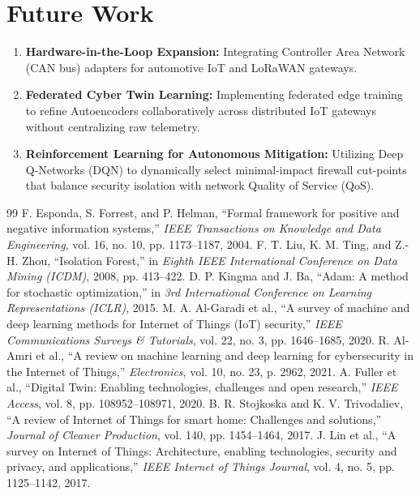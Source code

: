 \documentclass[12pt,a4paper]{report}
\begin{document}
\section{Future Work}
\begin{enumerate}
    \item \textbf{Hardware-in-the-Loop Expansion:} Integrating Controller Area Network (CAN bus) adapters for automotive IoT and LoRaWAN gateways.
    \item \textbf{Federated Cyber Twin Learning:} Implementing federated edge training to refine Autoencoders collaboratively across distributed IoT gateways without centralizing raw telemetry.
    \item \textbf{Reinforcement Learning for Autonomous Mitigation:} Utilizing Deep Q-Networks (DQN) to dynamically select minimal-impact firewall cut-points that balance security isolation with network Quality of Service (QoS).
\end{enumerate}

\begin{thebibliography}{99}
 F. Esponda, S. Forrest, and P. Helman, ``Formal framework for positive and negative information systems,'' \textit{IEEE Transactions on Knowledge and Data Engineering}, vol. 16, no. 10, pp. 1173--1187, 2004.
 F. T. Liu, K. M. Ting, and Z.-H. Zhou, ``Isolation Forest,'' in \textit{Eighth IEEE International Conference on Data Mining (ICDM)}, 2008, pp. 413--422.
 D. P. Kingma and J. Ba, ``Adam: A method for stochastic optimization,'' in \textit{3rd International Conference on Learning Representations (ICLR)}, 2015.
 M. A. Al-Garadi et al., ``A survey of machine and deep learning methods for Internet of Things (IoT) security,'' \textit{IEEE Communications Surveys \& Tutorials}, vol. 22, no. 3, pp. 1646--1685, 2020.
 R. Al-Amri et al., ``A review on machine learning and deep learning for cybersecurity in the Internet of Things,'' \textit{Electronics}, vol. 10, no. 23, p. 2962, 2021.
 A. Fuller et al., ``Digital Twin: Enabling technologies, challenges and open research,'' \textit{IEEE Access}, vol. 8, pp. 108952--108971, 2020.
 B. R. Stojkoska and K. V. Trivodaliev, ``A review of Internet of Things for smart home: Challenges and solutions,'' \textit{Journal of Cleaner Production}, vol. 140, pp. 1454--1464, 2017.
 J. Lin et al., ``A survey on Internet of Things: Architecture, enabling technologies, security and privacy, and applications,'' \textit{IEEE Internet of Things Journal}, vol. 4, no. 5, pp. 1125--1142, 2017.
\end{thebibliography}
\end{document}
